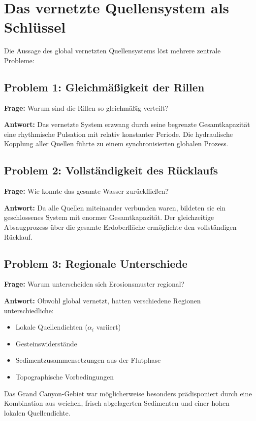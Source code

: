 ﻿\documentclass[12pt,a4paper]{report}
\begin{document}
\section{Das vernetzte Quellensystem als Schlüssel}

Die Aussage des global vernetzten Quellensystems löst mehrere zentrale Probleme:

\subsection{Problem 1: Gleichmäßigkeit der Rillen}

\textbf{Frage:} Warum sind die Rillen so gleichmäßig verteilt?

\textbf{Antwort:} Das vernetzte System erzwang durch seine begrenzte Gesamtkapazität eine rhythmische Pulsation mit relativ konstanter Periode. Die hydraulische Kopplung aller Quellen führte zu einem synchronisierten globalen Prozess.

\subsection{Problem 2: Vollständigkeit des Rücklaufs}

\textbf{Frage:} Wie konnte das gesamte Wasser zurückfließen?

\textbf{Antwort:} Da alle Quellen miteinander verbunden waren, bildeten sie ein geschlossenes System mit enormer Gesamtkapazität. Der gleichzeitige Absaugprozess über die gesamte Erdoberfläche ermöglichte den vollständigen Rücklauf.

\subsection{Problem 3: Regionale Unterschiede}

\textbf{Frage:} Warum unterscheiden sich Erosionsmuster regional?

\textbf{Antwort:} Obwohl global vernetzt, hatten verschiedene Regionen unterschiedliche:
\begin{itemize}
	\item Lokale Quellendichten ($\alpha_i$ variiert)
	\item Gesteinswiderstände
	\item Sedimentzusammensetzungen aus der Flutphase
	\item Topographische Vorbedingungen
\end{itemize}

Das Grand Canyon-Gebiet war möglicherweise besonders prädisponiert durch eine Kombination aus weichen, frisch abgelagerten Sedimenten und einer hohen lokalen Quellendichte.
\end{document}

